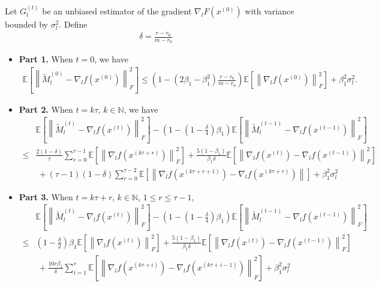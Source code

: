 \begin{lemma}\label{momentum_contraction}
Let \( G_l^{(t)} \) be an unbiased estimator of the gradient \( \nabla _l F(x^{(0)}) \) with variance bounded by \( \sigma_l^2 \). Define
\begin{align*}
    \delta=\frac{r-r_0}{m-r_0}
\end{align*}

\begin{itemize}
    \item {\bf Part 1.} When $t=0$, we have
\begin{align*}
    \mathbb{E}\left [ \left \| \tilde {M}_l^{(0)} -\nabla _lf(x^{(0)})\right \|_F^2  \right ] \le
    \left(1-(2\beta_1-\beta_1^2)\frac{r-r_0}{m-r_0} \right)\mathbb{E}\left [ \left \| \nabla_lf(x^{(0)}) \right \|_F^2  \right ]
    + \beta_1^2\sigma_l^2.
\end{align*}
    \item {\bf Part 2.} When $t=k\tau$, $k \in \mathbb{N}$, we have
\begin{align}\label{part2:momentum_contraction}
&\mathbb{E}\left[ \left \| \tilde{M}_l^{(t)}-\nabla _lf(x^{(t)})  \right \|_F^2 \right]-(1-(1-\frac{\delta}{4})\beta_1)\mathbb{E}\left[ \left \| \tilde{M}_l^{(t-1)}-\nabla _lf(x^{(t-1)})  \right \|_F^2 \right] \\
\leq&\frac{2(1-\delta)}{\tau}\sum_{r=0}^{\tau-1}\mathbb{E}\left [ \left \| \nabla _l f(x^{(k\tau+r)}) \right \|_F^2  \right ]+\frac{5(1-\beta_1)}{\beta_1\delta}\mathbb{E}\left [ \left \| \nabla _lf(x^{(t)})- \nabla _lf(x^{(t-1)})\right \|_F^2  \right ]\\
&~+(\tau-1)(1-\delta)\sum_{r=0}^{\tau-2}\mathbb{E}\left [ \left \| \nabla _lf(x^{(k\tau+r+1)})-\nabla _lf(x^{(k\tau+r)}) \right \|  \right ] + \beta_1^2\sigma _l^2
\end{align}


\item {\bf Part 3.} When $t=k\tau+r$, $k \in \mathbb{N}$, $1 \leq r \leq \tau-1$,
\begin{align*}\label{part 3: momentum contraction}
&\mathbb{E}\left[ \left \| \tilde{M}_l^{(t)}-\nabla _lf(x^{(t)})  \right \|_F^2 \right]-(1-(1-\frac{\delta}{4})\beta_1)\mathbb{E}\left[ \left \| \tilde{M}_l^{(t-1)}-\nabla _lf(x^{(t-1)})  \right \|_F^2 \right] \\
\leq&\left ( 1-\frac{\delta}{2} \right )\beta_1\mathbb{E}\left [ \left \| \nabla_lf(x^{(t)}) \right \| _F^2 \right ]   +\frac{5(1-\beta_1)}{\beta_1\delta}\mathbb{E}\left [ \left \| \nabla _lf(x^{(t)})- \nabla _lf(x^{(t-1)})\right \|_F^2  \right ]\\
&~+\frac{10r\beta_1}{\delta}\sum_{i=1}^{r}\mathbb{E}\left [ \left \| \nabla _lf(x^{(k\tau+i)})-\nabla _lf(x^{(k\tau+i-1)}) \right \| _F^2 \right ] + \beta_1^2\sigma _l^2
\end{align*}


\end{itemize}



\end{lemma}

